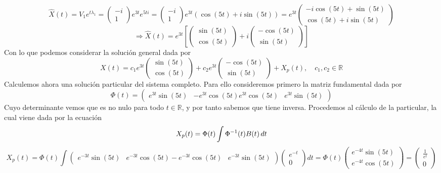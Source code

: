 \documentclass[fleqn]{article}
\def\R{\mathds{R}}
\begin{document}
    $$\hat{X}(t) = V_1e^{t\lambda_1} = \begin{pmatrix} -i \\ 1 \end{pmatrix} e^{3t} e^{5ti} = \begin{pmatrix} -i \\ 1 \end{pmatrix} e^{3t} (\cos(5t) + i\sin(5t))=
    e^{3t}
    \begin{pmatrix}
        -i\cos(5t) + \sin(5t)\\
        \cos(5t) + i\sin(5t)   
    \end{pmatrix}    
    $$
    $$
    \Rightarrow \hat{X}(t) = e^{3t} \left[
    \begin{pmatrix}
        \sin(5t) \\
        \cos(5t)
    \end{pmatrix}
    +i
    \begin{pmatrix}
        -\cos(5t)\\
        \sin(5t)
    \end{pmatrix}
    \right]
    $$
    Con lo que podemos considerar la solución general dada por 
    $$
    X(t) = 
    c_1e^{3t}
    \begin{pmatrix}
        \sin(5t) \\
        \cos(5t)
    \end{pmatrix}
    +c_2e^{3t}
    \begin{pmatrix}
        -\cos(5t)\\
        \sin(5t)
    \end{pmatrix}
    +X_p(t), \quad c_1,c_2 \in \R
    $$
    Calculemos ahora una solución particular del sistema completo. Para ello consideremos primero la matriz fundamental dada por 
    $$\Phi(t)=
    \begin{pmatrix}
        e^{3t}\sin(5t) & -e^{3t}\cos(5t)
        e^{3t}\cos(5t) & e^{3t}\sin(5t)
    \end{pmatrix}
    $$
    Cuyo determinante vemos que es no nulo para todo $t\in\R$, y por tanto sabemos que tiene inversa. Procedemos al cálculo de la particular, la cual viene dada por la ecuación
    $$X_p(t) = \Phi(t) \int \Phi^{-1}(t)B(t) \thinspace dt$$
    $$X_p(t) = \Phi(t) \int 
    \begin{pmatrix}
        e^{-3t}\sin(5t) & e^{-3t}\cos(5t)
        -e^{-3t}\cos(5t) & e^{-3t}\sin(5t)
    \end{pmatrix}
    \begin{pmatrix}
        e^{-t} \\ 0
    \end{pmatrix}
    dt = \Phi(t)
    \begin{pmatrix}
        e^{-4t}\sin(5t) \\ e^{-4t}\cos(5t)
    \end{pmatrix}
    =
    \begin{pmatrix}
        \frac{1}{e^{t}} \\ 0
    \end{pmatrix}
    $$
\end{document}
